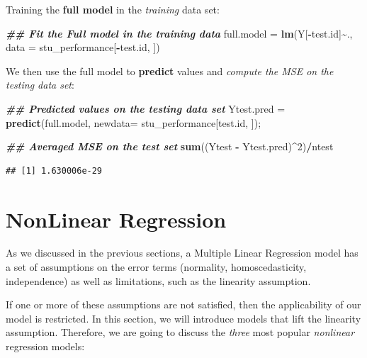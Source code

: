 \documentclass[
]{book}
\newenvironment{Shaded}{\begin{snugshade}}{\end{snugshade}}
\newcommand{\AttributeTok}[1]{\textcolor[rgb]{0.13,0.29,0.53}{#1}}
\newcommand{\DecValTok}[1]{\textcolor[rgb]{0.00,0.00,0.81}{#1}}
\newcommand{\DocumentationTok}[1]{\textcolor[rgb]{0.56,0.35,0.01}{\textbf{\textit{#1}}}}
\newcommand{\FunctionTok}[1]{\textcolor[rgb]{0.13,0.29,0.53}{\textbf{#1}}}
\newcommand{\NormalTok}[1]{#1}
\newcommand{\OtherTok}[1]{\textcolor[rgb]{0.56,0.35,0.01}{#1}}
\newcommand{\SpecialCharTok}[1]{\textcolor[rgb]{0.81,0.36,0.00}{\textbf{#1}}}
\begin{document}
Training the \textbf{full model} in the \emph{training} data set:

\begin{Shaded}
\begin{Highlighting}[]
\DocumentationTok{\#\# Fit the Full model in the training data}
\NormalTok{full.model }\OtherTok{=} \FunctionTok{lm}\NormalTok{(Y[}\SpecialCharTok{{-}}\NormalTok{test.id]}\SpecialCharTok{\textasciitilde{}}\NormalTok{., }\AttributeTok{data =}\NormalTok{ stu\_performance[}\SpecialCharTok{{-}}\NormalTok{test.id, ])}
\end{Highlighting}
\end{Shaded}

We then use the full model to \textbf{predict} values and \emph{compute the MSE on the testing data set}:

\begin{Shaded}
\begin{Highlighting}[]
\DocumentationTok{\#\# Predicted values on the testing data set}
\NormalTok{Ytest.pred }\OtherTok{=} \FunctionTok{predict}\NormalTok{(full.model, }\AttributeTok{newdata=}\NormalTok{ stu\_performance[test.id, ]);}

\DocumentationTok{\#\# Averaged MSE on the test set}
\FunctionTok{sum}\NormalTok{((Ytest }\SpecialCharTok{{-}}\NormalTok{ Ytest.pred)}\SpecialCharTok{\^{}}\DecValTok{2}\NormalTok{)}\SpecialCharTok{/}\NormalTok{ntest }
\end{Highlighting}
\end{Shaded}

\begin{verbatim}
## [1] 1.630006e-29
\end{verbatim}

\chapter{NonLinear Regression}\label{nonlinear-regression}

As we discussed in the previous sections, a Multiple Linear Regression model has a set of assumptions on the error terms (normality, homoscedasticity, independence) as well as limitations, such as the linearity assumption.

If one or more of these assumptions are not satisfied, then the applicability of our model is restricted. In this section, we will introduce models that lift the linearity assumption. Therefore, we are going to discuss the \emph{three} most popular \emph{nonlinear} regression models:
\end{document}
